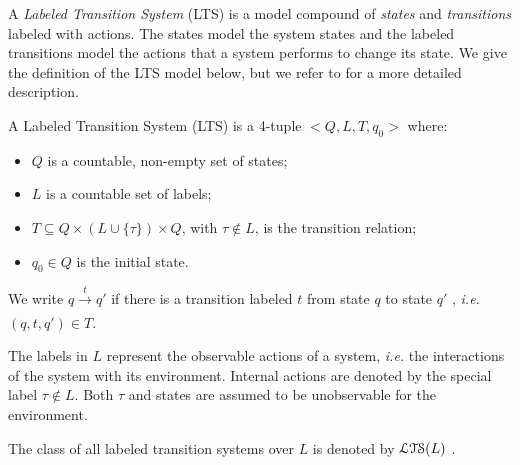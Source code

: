 A \textit{Labeled Transition System} (LTS)
\cite{milner1980calculus} is a model compound of \emph{states}
and \emph{transitions} labeled with actions.  The states model
the system states and the labeled transitions model the actions
that a system performs to change its state.  We give the
definition of the LTS model below, but we refer to
\cite{Tre96,ltsTretmans} for a more detailed description.

\begin{definition}
    A Labeled Transition System (LTS) is a 4-tuple $<Q,L,T,q_0>$
    where:

    \begin{itemize}
    \item $Q$ is a countable, non-empty set of states;

    \item $L$ is a countable set of labels;

    \item $T \subseteq Q \times (L \cup \{\tau\}) \times Q$, with
    $\tau \not\in L$, is the transition relation;

    \item $q_0 \in Q$ is the initial state.

    \end{itemize}

    We write $q \xrightarrow[]{t} q'$ if there is a transition
    labeled $t$ from state $q$ to state $q'$ , \emph{i.e.} $(q,
    t, q') \in T$.

    The labels in $L$ represent the observable actions of a
    system, \emph{i.e.} the interactions of the system with its
    environment.  Internal actions are denoted by the special
    label $\tau \not\in L$. Both $\tau$ and states are assumed to
    be unobservable for the environment.

    The class of all labeled transition systems over $L$ is
    denoted by $\EuScript{LTS}(L)$ \cite{Tre96}.

	\label{def:lts}
\end{definition}

